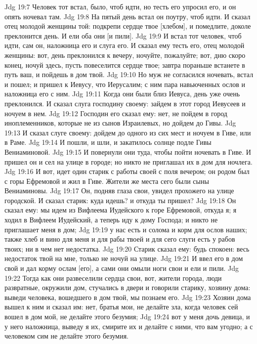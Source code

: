 \vs Jdg 19:7 Человек тот встал, было, чтоб идти, но тесть его упросил его, и он опять ночевал там.
\vs Jdg 19:8 На пятый день встал он поутру, чтоб идти. И сказал отец молодой женщины той: подкрепи сердце твое [хлебом], и помедлите, доколе преклонится день. И ели оба они [и пили].
\vs Jdg 19:9 И встал тот человек, чтоб идти, сам он, наложница его и слуга его. И сказал ему тесть его, отец молодой женщины: вот, день преклонился к вечеру, ночуйте, пожалуйте; вот, дню скоро конец, ночуй здесь, пусть повеселится сердце твое; завтра пораньше встанете в путь ваш, и пойдешь в дом твой.
\vs Jdg 19:10 Но муж не согласился ночевать, встал и пошел; и пришел к Иевусу, что  Иерусалим; с ним пара навьюченных ослов и наложница его с ним.
\vs Jdg 19:11 Когда они были близ Иевуса, день уже очень преклонился. И сказал слуга господину своему: зайдем в этот город Иевусеев и ночуем в нем.
\vs Jdg 19:12 Господин его сказал ему: нет, не пойдем в город иноплеменников, которые не из сынов Израилевых, но дойдем до Гивы.
\vs Jdg 19:13 И сказал слуге своему: дойдем до одного из сих мест и ночуем в Гиве, или в Раме.
\vs Jdg 19:14 И пошли, и шли, и закатилось солнце подле Гивы Вениаминовой.
\vs Jdg 19:15 И повернули они туда, чтобы пойти ночевать в Гиве. И пришел он и сел на улице в городе; но никто не приглашал их в дом для ночлега.
\vs Jdg 19:16 И вот, идет один старик с работы своей с поля вечером; он родом был с горы Ефремовой и жил в Гиве. Жители же места сего были сыны Вениаминовы.
\vs Jdg 19:17 Он, подняв глаза свои, увидел прохожего на улице городской. И сказал старик: куда идешь? и откуда ты пришел?
\vs Jdg 19:18 Он сказал ему: мы идем из Вифлеема Иудейского к горе Ефремовой, откуда я; я ходил в Вифлеем Иудейский, а теперь иду к дому Господа; и никто не приглашает меня в дом;
\vs Jdg 19:19 у нас есть и солома и корм для ослов наших; также хлеб и вино для меня и для рабы твоей и для сего слуги есть у рабов твоих; ни в чем нет недостатка.
\vs Jdg 19:20 Старик сказал ему: будь спокоен: весь недостаток твой на мне, только не ночуй на улице.
\vs Jdg 19:21 И ввел его в дом свой и дал корму ослам [его], а сами они омыли ноги свои и ели и пили.
\vs Jdg 19:22 Тогда как они развеселили сердца свои, вот, жители города, люди развратные, окружили дом, стучались в двери и говорили старику, хозяину дома: выведи человека, вошедшего в дом твой, мы познаем его.
\vs Jdg 19:23 Хозяин дома вышел к ним и сказал им: нет, братья мои, не делайте зла, когда человек сей вошел в дом мой, не делайте этого безумия;
\vs Jdg 19:24 вот у меня дочь девица, и у него наложница, выведу я их, смирите их и делайте с ними, что вам угодно; а с человеком сим не делайте этого безумия.
